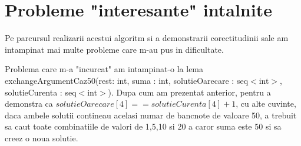 \section{Probleme "interesante" intalnite}
Pe parcursul realizarii acestui algoritm si a demonstrarii corectitudinii sale am intampinat mai multe probleme care m-au pus in dificultate. \par  
Problema care m-a "incurcat" am intampinat-o la lema exchangeArgumentCaz50(rest: int, suma : int, solutieOarecare : seq$<$int$>$, solutieCurenta : seq$<$int$>$). Dupa cum am prezentat anterior, pentru a demonstra ca $solutieOarecare[4] == solutieCurenta[4] + 1$, cu alte cuvinte, daca ambele solutii contineau acelasi numar de bancnote de valoare 50, a trebuit sa caut toate combinatiile de valori de 1,5,10 si 20 a caror suma este 50 si sa creez o noua solutie. \par 
